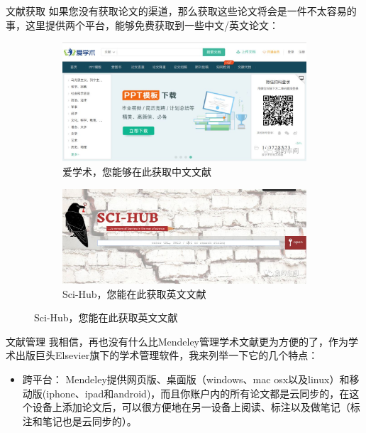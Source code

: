 \documentclass[presentation]{beamer}
\begin{document}
\begin{frame}{文献获取}
	如果您没有获取论文的渠道，那么获取这些论文将会是一件不太容易的事，这里提供两个平台，能够免费获取到一些中文/英文论文：
    \begin{figure}
        \centering
        \begin{subfigure}{.5\textwidth}
              \centering
              \includegraphics[width=0.8\linewidth]{_11.png}
              \caption{爱学术，您能够在此获取中文文献}
        \end{subfigure}%
        \begin{subfigure}{.5\textwidth}
              \centering
              \includegraphics[width=0.8\linewidth]{_12.png}
              \caption{Sci-Hub，您能在此获取英文文献}
        \end{subfigure}
    \end{figure}
\end{frame}

\begin{frame}{文献管理}
	我相信，再也没有什么比Mendeley管理学术文献更为方便的了，作为学术出版巨头Elsevier旗下的学术管理软件，我来列举一下它的几个特点：
	\begin{itemize}
	    \item 跨平台：
        Mendeley提供网页版、桌面版（windows、mac osx以及linux）和移动版(iphone、ipad和android)，而且你账户内的所有论文都是云同步的，在这个设备上添加论文后，可以很方便地在另一设备上阅读、标注以及做笔记（标注和笔记也是云同步的）。
	\end{itemize}
\end{frame}
\end{document}
